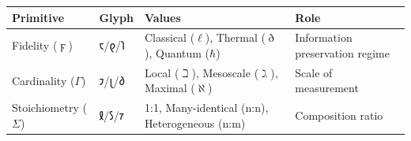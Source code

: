 \documentclass[12pt,a4paper]{article}
\begin{document}
\begin{longtable}[]{@{}llll@{}}
\toprule
\begin{minipage}[b]{0.30\columnwidth}\raggedright
Primitive\strut
\end{minipage} & \begin{minipage}[b]{0.19\columnwidth}\raggedright
Glyph\strut
\end{minipage} & \begin{minipage}[b]{0.22\columnwidth}\raggedright
Values\strut
\end{minipage} & \begin{minipage}[b]{0.17\columnwidth}\raggedright
Role\strut
\end{minipage}\tabularnewline
\midrule
\endhead
\begin{minipage}[t]{0.30\columnwidth}\raggedright
Fidelity (\(\digamma\))\strut
\end{minipage} & \begin{minipage}[t]{0.19\columnwidth}\raggedright
𐑱/𐑞/𐑐\strut
\end{minipage} & \begin{minipage}[t]{0.22\columnwidth}\raggedright
Classical (\(\ell\)), Thermal (\(\eth\)), Quantum (\(\hbar\))\strut
\end{minipage} & \begin{minipage}[t]{0.17\columnwidth}\raggedright
Information preservation regime\strut
\end{minipage}\tabularnewline
\begin{minipage}[t]{0.30\columnwidth}\raggedright
Cardinality (\(\Gamma\))\strut
\end{minipage} & \begin{minipage}[t]{0.19\columnwidth}\raggedright
𐑲/𐑚/𐑔\strut
\end{minipage} & \begin{minipage}[t]{0.22\columnwidth}\raggedright
Local (\(\beth\)), Mesoscale (\(\gimel\)), Maximal (\(\aleph\))\strut
\end{minipage} & \begin{minipage}[t]{0.17\columnwidth}\raggedright
Scale of measurement\strut
\end{minipage}\tabularnewline
\begin{minipage}[t]{0.30\columnwidth}\raggedright
Stoichiometry (\(\Sigma\))\strut
\end{minipage} & \begin{minipage}[t]{0.19\columnwidth}\raggedright
𐑙/𐑕/𐑳\strut
\end{minipage} & \begin{minipage}[t]{0.22\columnwidth}\raggedright
1:1, Many-identical (n:n), Heterogeneous (n:m)\strut
\end{minipage} & \begin{minipage}[t]{0.17\columnwidth}\raggedright
Composition ratio\strut
\end{minipage}\tabularnewline
\bottomrule
\end{longtable}
\end{document}
